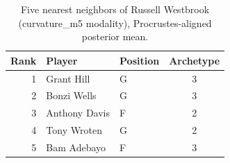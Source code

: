\begin{table}[htbp]
  \centering\small
  \begin{tabular}{rllc}
    \toprule
    Rank & Player & Position & Archetype \\
    \midrule
    1 & Grant Hill & G & 3 \\
    2 & Bonzi Wells & G & 3 \\
    3 & Anthony Davis & F & 2 \\
    4 & Tony Wroten & G & 2 \\
    5 & Bam Adebayo & F & 3 \\
    \bottomrule
  \end{tabular}
  \caption{Five nearest neighbors of Russell Westbrook (curvature_m5 modality), Procrustes-aligned posterior mean.}
  \label{tab:Russell_Westbrook_neighbors_curvature_m5}
\end{table}

